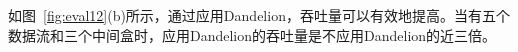 
如图~\ref{fig:eval12}(b)所示，通过应用Dandelion，吞吐量可以有效地提高。当有五个数据流和三个中间盒时，应用Dandelion的吞吐量是不应用Dandelion的近三倍。


